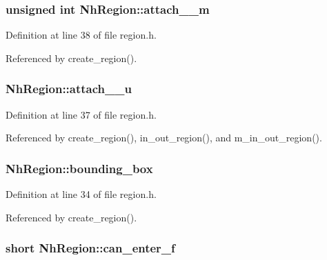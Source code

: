 \hypertarget{structNhRegion_adefa5343cc4f6d9763f0a3a0038f22ca}{
\subsubsection[{attach\+\_\+2\+\_\+m}]{\setlength{\rightskip}{0pt plus 5cm}unsigned int Nh\+Region\+::attach\+\_\+\_\+m}}\label{structNhRegion_adefa5343cc4f6d9763f0a3a0038f22ca}


Definition at line 38 of file region.\+h.



Referenced by create\+\_\+region().

\hypertarget{structNhRegion_a21f1c70cde4b7c95d16fc3e452bf1c91}{
\subsubsection[{attach\+\_\+2\+\_\+u}]{ Nh\+Region\+::attach\+\_\+\_\+u}}\label{structNhRegion_a21f1c70cde4b7c95d16fc3e452bf1c91}


Definition at line 37 of file region.\+h.



Referenced by create\+\_\+region(), in\+\_\+out\+\_\+region(), and m\+\_\+in\+\_\+out\+\_\+region().

\hypertarget{structNhRegion_a81d129b9fa7d98ab862162b7d5ea0e4d}{
\subsubsection[{bounding\+\_\+box}]{ Nh\+Region\+::bounding\+\_\+box}}\label{structNhRegion_a81d129b9fa7d98ab862162b7d5ea0e4d}


Definition at line 34 of file region.\+h.



Referenced by create\+\_\+region().

\hypertarget{structNhRegion_a6ecb97e787cdcba6d6142ebe85192363}{
\subsubsection[{can\+\_\+enter\+\_\+f}]{\setlength{\rightskip}{0pt plus 5cm}short Nh\+Region\+::can\+\_\+enter\+\_\+f}}\label{structNhRegion_a6ecb97e787cdcba6d6142ebe85192363}


